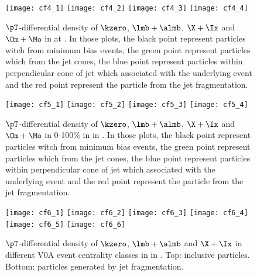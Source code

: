 \begin{figure}[!ht]
	\begin{center}
		\texttt{[image: cf4\_1]}
		\texttt{[image: cf4\_2]}
		\texttt{[image: cf4\_3]}
		\texttt{[image: cf4\_4]}
	\end{center}
	\caption{$\pT$-differential density of $\kzero$, $\lmb + \almb$, $\X + \Ix$ and $\Om + \Mo$ in \pp at \thirteen. In those plots, the black point represent particles witch from minimum bias events, the green point represent particles which from the jet cones, the blue point represent particles within perpendicular cone of jet which associated with the underlying event and the red point represent the particle from the jet fragmentation.}
	\label{fig:ppSpect}
\end{figure}
\begin{figure}[!ht]
	\begin{center}
		\texttt{[image: cf5\_1]}
		\texttt{[image: cf5\_2]}
		\texttt{[image: cf5\_3]}
		\texttt{[image: cf5\_4]}
	\end{center}
	\caption{$\pT$-differential density of $\kzero$, $\lmb + \almb$, $\X + \Ix$ and $\Om + \Mo$ in 0-100\% in \pPb in \fivenn. In those plots, the black point represent particles witch from minimum bias events, the green point represent particles which from the jet cones, the blue point represent particles within perpendicular cone of jet which associated with the underlying event and the red point represent the particle from the jet fragmentation.}
	\label{fig:pPbSpect}
\end{figure}
\begin{figure}[!ht]
\begin{center}
	\texttt{[image: cf6\_1]}
	\texttt{[image: cf6\_2]}
	\texttt{[image: cf6\_3]}
	\texttt{[image: cf6\_4]}
	\texttt{[image: cf6\_5]}
	\texttt{[image: cf6\_6]}
\end{center}
\caption{$\pT$-differential density of $\kzero$, $\lmb + \almb$ and $\X + \Ix$ in different V0A event centrality classes in \pPb in \fivenn. Top: inclusive particles. Bottom: particles generated by jet fragmentation. }
\label{fig:pPbSpectwCent}
\end{figure}
